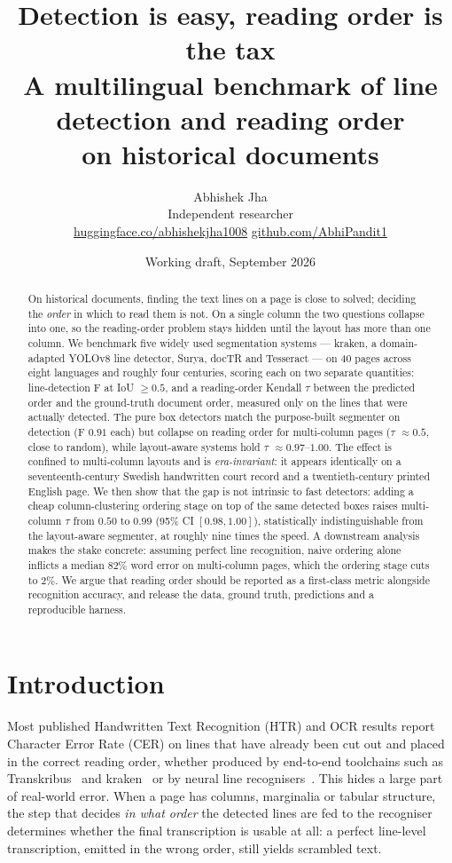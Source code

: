 \documentclass[11pt]{article}
\title{\vspace{-2.2em}\bfseries Detection is easy, reading order is the tax\\[0.35em]
\large\mdseries A multilingual benchmark of line detection and reading order\\
on historical documents}
\author{Abhishek Jha\\[0.2em]
\small Independent researcher\\
\small \href{https://huggingface.co/abhishekjha1008}{huggingface.co/abhishekjha1008} \;\textperiodcentered\;
\href{https://github.com/AbhiPandit1}{github.com/AbhiPandit1}}
\date{\small Working draft, September 2026}
\newcommand{\tw}{\ensuremath{\tau}}
\begin{document}
\maketitle
\thispagestyle{empty}

\begin{abstract}
\noindent
On historical documents, finding the text lines on a page is close to solved;
deciding the \emph{order} in which to read them is not. On a single column the two
questions collapse into one, so the reading-order problem stays hidden until the
layout has more than one column. We benchmark five widely used segmentation
systems --- kraken, a domain-adapted YOLOv8 line detector, Surya, docTR and
Tesseract --- on 40 pages across eight languages and roughly four centuries,
scoring each on two separate quantities: line-detection F at IoU $\ge 0.5$, and a
reading-order Kendall \tw{} between the predicted order and the ground-truth
document order, measured only on the lines that were actually detected. The pure
box detectors match the purpose-built segmenter on detection (F $0.91$ each) but
collapse on reading order for multi-column pages (\tw{} $\approx 0.5$, close to
random), while layout-aware systems hold \tw{} $\approx 0.97$--$1.00$. The effect
is confined to multi-column layouts and is \emph{era-invariant}: it appears
identically on a seventeenth-century Swedish handwritten court record and a
twentieth-century printed English page. We then show that the gap is not
intrinsic to fast detectors: adding a cheap column-clustering ordering stage on
top of the same detected boxes raises multi-column \tw{} from $0.50$ to $0.99$
(95\% CI $[0.98,1.00]$), statistically indistinguishable from the layout-aware
segmenter, at roughly nine times the speed. A downstream analysis makes the stake
concrete: assuming perfect line recognition, naive ordering alone inflicts a
median $82\%$ word error on multi-column pages, which the ordering stage cuts to
$2\%$. We argue that reading order should be reported as a first-class metric
alongside recognition accuracy, and release the data, ground truth, predictions
and a reproducible harness.
\end{abstract}

\section{Introduction}

Most published Handwritten Text Recognition (HTR) and OCR results report Character
Error Rate (CER) on lines that have already been cut out and placed in the correct
reading order, whether produced by end-to-end toolchains such as
Transkribus~\cite{transkribus} and kraken~\cite{kraken} or by neural line
recognisers~\cite{pylaia}. This hides a large part of real-world error. When a page has
columns, marginalia or tabular structure, the step that decides \emph{in what
order} the detected lines are fed to the recogniser determines whether the final
transcription is usable at all: a perfect line-level transcription, emitted in the
wrong order, still yields scrambled text.
\end{document}
